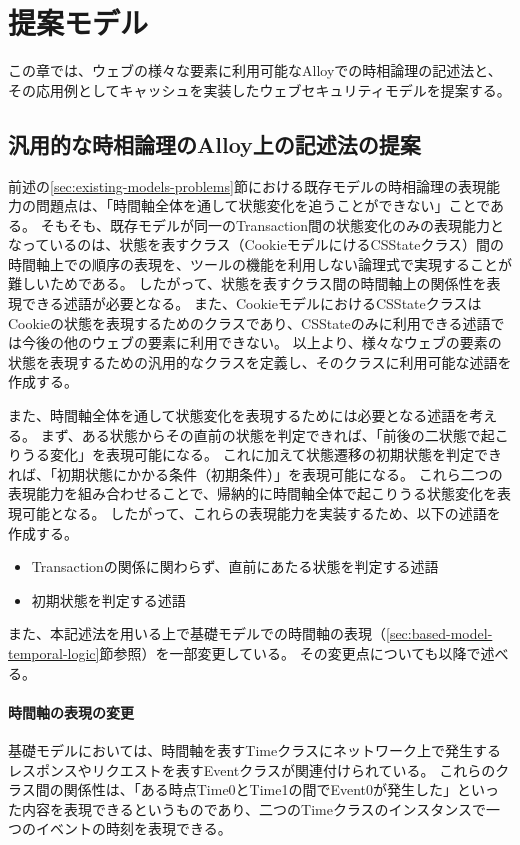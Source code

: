\documentclass[12pt,a4paper]{jbook}
\begin{document}
\newpage

\chapter{提案モデル}
\color{red}
この章では、ウェブの様々な要素に利用可能なAlloyでの時相論理の記述法と、その応用例としてキャッシュを実装したウェブセキュリティモデルを提案する。
\color{black}

\section{汎用的な時相論理のAlloy上の記述法の提案}
\label{sec:ProposedModel-TemporalLogic}
\color{red}
前述の\ref{sec:existing-models-problems}節における既存モデルの時相論理の表現能力の問題点は、「時間軸全体を通して状態変化を追うことができない」ことである。
そもそも、既存モデルが同一のTransaction間の状態変化のみの表現能力となっているのは、状態を表すクラス（CookieモデルにけるCSStateクラス）間の時間軸上での順序の表現を、ツールの機能を利用しない論理式で実現することが難しいためである。
したがって、状態を表すクラス間の時間軸上の関係性を表現できる述語が必要となる。
また、CookieモデルにおけるCSStateクラスはCookieの状態を表現するためのクラスであり、CSStateのみに利用できる述語では今後の他のウェブの要素に利用できない。
以上より、様々なウェブの要素の状態を表現するための汎用的なクラスを定義し、そのクラスに利用可能な述語を作成する。

また、時間軸全体を通して状態変化を表現するためには必要となる述語を考える。
まず、ある状態からその直前の状態を判定できれば、「前後の二状態で起こりうる変化」を表現可能になる。
これに加えて状態遷移の初期状態を判定できれば、「初期状態にかかる条件（初期条件）」を表現可能になる。
これら二つの表現能力を組み合わせることで、帰納的に時間軸全体で起こりうる状態変化を表現可能となる。
したがって、これらの表現能力を実装するため、以下の述語を作成する。
\begin{itemize}
\item Transactionの関係に関わらず、直前にあたる状態を判定する述語
\item 初期状態を判定する述語
\end{itemize}

また、本記述法を用いる上で基礎モデルでの時間軸の表現（\ref{sec:based-model-temporal-logic}節参照）を一部変更している。
その変更点についても以降で述べる。

\subsubsection{時間軸の表現の変更}
基礎モデル\cite{based-model}においては、時間軸を表すTimeクラスにネットワーク上で発生するレスポンスやリクエストを表すEventクラスが関連付けられている。
これらのクラス間の関係性は、「ある時点Time0とTime1の間でEvent0が発生した」といった内容を表現できるというものであり、二つのTimeクラスのインスタンスで一つのイベントの時刻を表現できる。
\end{document}

